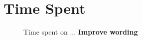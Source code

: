 \documentclass[../dissertation.tex]{subfiles}
\begin{document}
\section{Time Spent}
\begin{figure}[h!]
  \centering
  \caption{Time spent on ... \textbf{Improve wording}}
\end{figure}
\end{document}
